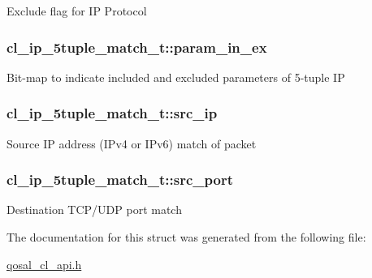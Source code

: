 Exclude flag for I\-P Protocol \hypertarget{structcl__ip__5tuple__match__t_af95e2941e57be656c6fd1490345bd7a3}{
\subsubsection[{param\-\_\-in\-\_\-ex}]{ cl\-\_\-ip\-\_\-5tuple\-\_\-match\-\_\-t\-::param\-\_\-in\-\_\-ex}}\label{structcl__ip__5tuple__match__t_af95e2941e57be656c6fd1490345bd7a3}
Bit-\/map to indicate included and excluded parameters of 5-\/tuple I\-P \hypertarget{structcl__ip__5tuple__match__t_aeb63c3c0bd893819a2257c47c4d1f1c8}{
\subsubsection[{src\-\_\-ip}]{ cl\-\_\-ip\-\_\-5tuple\-\_\-match\-\_\-t\-::src\-\_\-ip}}\label{structcl__ip__5tuple__match__t_aeb63c3c0bd893819a2257c47c4d1f1c8}
Source I\-P address (I\-Pv4 or I\-Pv6) match of packet \hypertarget{structcl__ip__5tuple__match__t_ae35e648a631112c8bf6e7473e2f5f8e8}{
\subsubsection[{src\-\_\-port}]{ cl\-\_\-ip\-\_\-5tuple\-\_\-match\-\_\-t\-::src\-\_\-port}}\label{structcl__ip__5tuple__match__t_ae35e648a631112c8bf6e7473e2f5f8e8}
Destination T\-C\-P/\-U\-D\-P port match 

The documentation for this struct was generated from the following file\-:\begin{DoxyCompactItemize}
\item 
\hyperlink{qosal__cl__api_8h}{qosal\-\_\-cl\-\_\-api.\-h}\end{DoxyCompactItemize}
